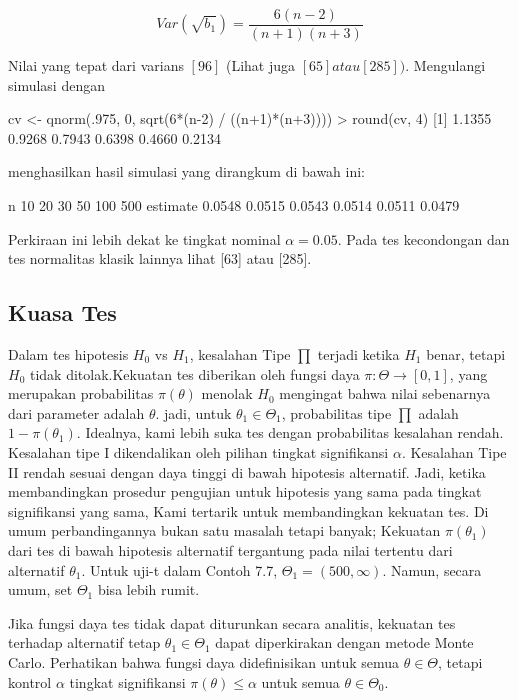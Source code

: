 \documentclass[a4paper,12pt]{article}
\theoremstyle{definition}
\begin{document}
\begin{equation}
    Var \left ( \sqrt{b_{1}} \right ) = \frac{6(n-2)}{(n+1)(n+3)}
\end{equation}

Nilai yang tepat dari varians $[96]$ (Lihat juga $[65] atau [285])$. Mengulangi simulasi dengan

\begin{spverbatim}
    cv <- qnorm(.975, 0, sqrt(6*(n-2) / ((n+1)*(n+3))))
    > round(cv, 4)
    [1] 1.1355 0.9268 0.7943 0.6398 0.4660 0.2134
\end{spverbatim}

menghasilkan hasil simulasi yang dirangkum di bawah ini:
\begin{spverbatim}
    n          10     20     30     50     100    500
    estimate 0.0548 0.0515 0.0543 0.0514 0.0511 0.0479
\end{spverbatim}

Perkiraan ini lebih dekat ke tingkat nominal $\alpha = 0.05.$  Pada tes kecondongan dan tes normalitas klasik lainnya lihat [63] atau [285]. 


\subsection{Kuasa Tes}
Dalam tes hipotesis $H_{0}$ vs $H_{1}$, kesalahan Tipe $\prod$ terjadi ketika $H_{1}$ benar, tetapi $H_{0}$ tidak ditolak.Kekuatan tes diberikan oleh fungsi daya $\pi:\Theta\rightarrow\left[0,1\right]$, yang merupakan probabilitas $\pi(\theta)$ menolak $H_{0}$ mengingat bahwa nilai sebenarnya dari parameter adalah $\theta$. jadi, untuk $\theta_{1}\in\Theta_{1}$, probabilitas tipe $\prod$ adalah $1-\pi(\theta_{1})$. Idealnya, kami lebih suka tes dengan probabilitas kesalahan rendah. Kesalahan tipe I dikendalikan oleh pilihan tingkat signifikansi $\alpha$. Kesalahan Tipe II rendah sesuai dengan daya tinggi di bawah hipotesis alternatif. Jadi, ketika membandingkan prosedur pengujian untuk hipotesis yang sama pada tingkat signifikansi yang sama, Kami tertarik untuk membandingkan kekuatan tes. Di umum perbandingannya bukan satu masalah tetapi banyak; Kekuatan $\pi(\theta_{1})$ dari tes di bawah hipotesis alternatif tergantung pada nilai tertentu dari alternatif $\theta_{1}$. Untuk uji-t dalam Contoh 7.7, $\Theta_{1}=(500,\infty)$. Namun, secara umum, set $\Theta_{1}$ bisa lebih rumit. 

Jika fungsi daya tes tidak dapat diturunkan secara analitis, kekuatan tes terhadap alternatif tetap $\theta_{1}\in\Theta_{1}$ dapat diperkirakan dengan metode Monte Carlo. Perhatikan bahwa fungsi daya didefinisikan untuk semua $\theta\in\Theta$, tetapi kontrol $\alpha$ tingkat signifikansi $\pi(\theta)\leq\alpha$  untuk semua $\theta\in\Theta_{0}$. 
\end{document}
